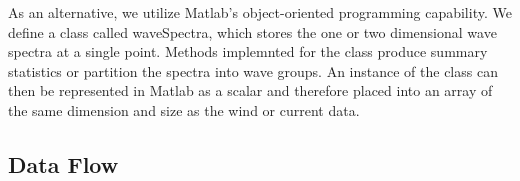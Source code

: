 \documentclass[11pt,letterpaper,oneside,reqno]{article}
\begin{document}
As an alternative, we utilize Matlab's object-oriented programming
capability. We define a class called waveSpectra, which stores the
one or two dimensional wave spectra at a single point. Methods
implemnted for the class produce summary statistics or partition
the spectra into wave groups. An instance of the class can then be
represented in Matlab as a scalar and therefore placed into an
array of the same dimension and size as the wind or current data.

\subsection{Data Flow}






\end{document}
